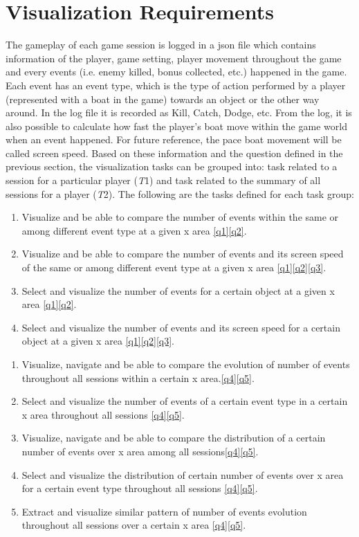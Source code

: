\section{Visualization Requirements}

The gameplay of each game session is logged in a json file which contains information of the player, game setting, player movement throughout the game and every events (i.e. enemy killed, bonus collected, etc.) happened in the game. Each event has an event type, which is the type of action performed by a player (represented with a boat in the game) towards an object or the other way around. In the log file it is recorded as Kill, Catch, Dodge, etc. From the log, it is also possible to calculate how fast the player's boat move within the game world when an event happened. For future reference, the pace boat movement will be called screen speed. Based on these information and the question defined in the previous section, the visualization tasks can be grouped into: task related to a session for a particular player (\textit{T}1) and task related to the summary of all sessions for a player (\textit{T}2). The following are the tasks defined for each task group:
\newcommand{\task}[2]{$#1 #2$}
\begin{enumerate}[label=\textbf{(\task{T1.}{\arabic*})}]
\item \label{t11} Visualize and be able to compare the number of events within the same or among different event type at a given x area \ref{q1}\ref{q2}.
\item \label{t12} Visualize and be able to compare the number of events and its screen speed of the same or among different event type at a given x area \ref{q1}\ref{q2}\ref{q3}.
\item \label{t13} Select and visualize the number of events for a certain object at a given x area \ref{q1}\ref{q2}.
\item \label{t14} Select and visualize the number of events and its screen speed for a certain object at a given x area \ref{q1}\ref{q2}\ref{q3}.
\end{enumerate}

\newcommand{\test}[2]{$#1 #2$}
\begin{enumerate}[label=\textbf{(\test{T2.}{\arabic*})}]
\item \label{t21} Visualize, navigate and be able to compare the evolution of number of events throughout all sessions within a certain x area.\ref{q4}\ref{q5}.
\item \label{t22} Select and visualize the number of events of a certain event type in a certain x area throughout all sessions \ref{q4}\ref{q5}.
\item \label{t23} Visualize, navigate and be able to compare the distribution of a certain number of events over x area among all sessions\ref{q4}\ref{q5}.
\item \label{t24} Select and visualize the distribution of certain number of events over x area for a certain event type throughout all sessions \ref{q4}\ref{q5}.
\item \label{t25} Extract and visualize similar pattern of number of events evolution throughout all sessions over a certain x area \ref{q4}\ref{q5}.
\end{enumerate}
